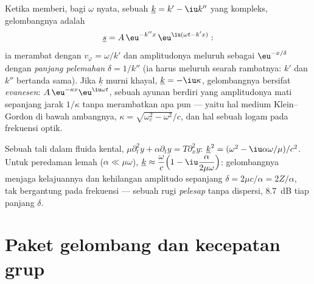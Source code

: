 \begin{definition}\label{def:b2:dispersion-wave-packets:complex}
Ketika  memberi, bagi $\omega$ nyata, sebuah
$\underline k = k' - \iu k''$ yang kompleks, gelombangnya adalah
\[
\underline s = A\,\eu^{-k''x}\,\eu^{\iu(\omega t - k'x)} :
\]
ia merambat dengan $v_\varphi = \omega/k'$ dan amplitudonya meluruh sebagai
$\eu^{-x/\delta}$ dengan \emph{panjang pelemahan} $\delta = 1/k''$ (ia harus
meluruh searah rambatnya: $k'$ dan $k''$ bertanda sama).
Jika $\underline k$ murni khayal, $\underline k = -\iu\kappa$, gelombangnya bersifat
\emph{evanesen}: $A\,\eu^{-\kappa x}\eu^{\iu\omega t}$, sebuah ayunan berdiri
yang amplitudonya mati sepanjang jarak $1/\kappa$ tanpa merambatkan
apa pun --- yaitu hal medium Klein--Gordon di bawah ambangnya,
$\kappa = \sqrt{\omega_c^2 - \omega^2}/c$, dan hal sebuah logam pada frekuensi optik.
\end{definition}

\begin{example}\label{ex:b2:dispersion-wave-packets:damped}
Sebuah tali dalam fluida kental, $\mu\partial_t^2y + \alpha\partial_ty = T\partial_x^2y$:
$\underline k^2 = (\omega^2 - \iu\alpha\omega/\mu)/c^2$. Untuk peredaman lemah ($\alpha \ll \mu
\omega$), $\underline k \approx \dfrac\omega c\Bigl(1 - \iu\dfrac{\alpha}{2\mu\omega}\Bigr)$: gelombangnya
menjaga kelajuannya dan kehilangan amplitudo sepanjang $\delta = 2\mu c/\alpha = 2Z/\alpha$,
tak bergantung pada frekuensi --- sebuah rugi \emph{pelesap} tanpa dispersi,
\qty{8.7}{dB} tiap panjang $\delta$.
\end{example}

\section{Paket gelombang dan kecepatan grup}

